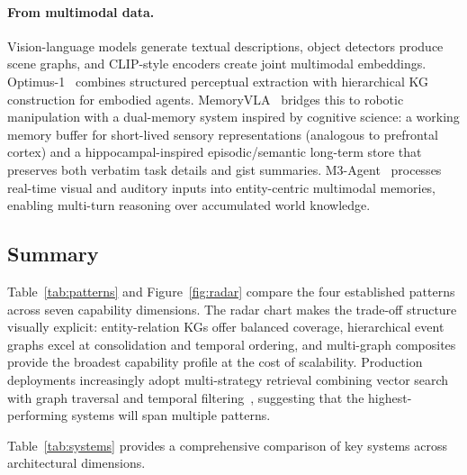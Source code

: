 \documentclass[hf]{ceurart}
\begin{document}
\paragraph{From multimodal data.}
Vision-language models generate textual descriptions, object detectors
produce scene graphs, and CLIP-style encoders create joint multimodal
embeddings. Optimus-1~\cite{optimus2024} combines structured perceptual
extraction with hierarchical KG construction for embodied agents.
MemoryVLA~\cite{memoryvla2025} bridges this to robotic manipulation
with a dual-memory system inspired by cognitive science: a working
memory buffer for short-lived sensory representations (analogous to
prefrontal cortex) and a hippocampal-inspired episodic/semantic
long-term store that preserves both verbatim task details and gist
summaries. M3-Agent~\cite{m3agent2025} processes real-time visual and
auditory inputs into entity-centric multimodal memories, enabling
multi-turn reasoning over accumulated world knowledge.

\subsection{Summary}

Table~\ref{tab:patterns} and Figure~\ref{fig:radar} compare the four
established patterns across seven capability dimensions. The radar chart
makes the trade-off structure visually explicit: entity-relation KGs
offer balanced coverage, hierarchical event graphs excel at
consolidation and temporal ordering, and multi-graph composites provide
the broadest capability profile at the cost of scalability.
Production deployments increasingly adopt multi-strategy retrieval
combining vector search with graph traversal and temporal
filtering~\cite{hindsight2025,vectorize2026}, suggesting that the
highest-performing systems will span multiple patterns.

Table~\ref{tab:systems} provides a comprehensive comparison of key
systems across architectural dimensions.
\end{document}
